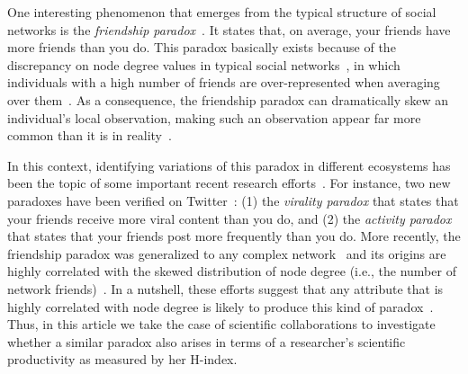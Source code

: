 \documentclass[smallextended]{svjour3}
\begin{document}
One interesting phenomenon that emerges from the typical structure of social networks is the \textit{friendship paradox}~\cite{quatro}. It states that, on average, your friends have more friends than you do. This paradox basically exists because of the discrepancy on node degree values in typical social networks~\cite{barabasi1999emergence}, in which individuals with a high number of friends are over-represented when averaging over them~\cite{hodas2014icwsm}. As a consequence, the friendship paradox can dramatically skew an individual's local observation, making such an observation appear far more common than it is in reality~\cite{centola2010spread,salganik2006experimental}.

In this context, identifying variations of this paradox in different ecosystems has been the topic of some important recent research efforts~\cite{eom2014generalized,tres,lerman2015majority}. For instance, two new paradoxes have been verified on Twitter~\cite{tres}: (1) the \textit{virality paradox} that states that your friends receive more viral content than you do, and (2) the \textit{activity paradox} that states that your friends post more frequently than you do. More recently, the friendship paradox was generalized to any complex network~\cite{eom2014generalized} and its origins are highly correlated with the skewed distribution of node degree (i.e., the number of network friends)~\cite{hodas2014icwsm}. In a nutshell, these efforts suggest that any attribute that is highly correlated with node degree is likely to produce this kind of paradox~\cite{eom2014generalized}. Thus, in this article we take the case of scientific collaborations to investigate whether a similar paradox also arises in terms of a researcher's scientific productivity as measured by her H-index.
\end{document}

